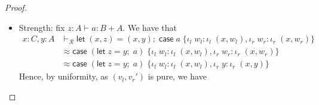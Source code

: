 \documentclass[acmsmall,screen,anonymous,review]{acmart}
\newcommand{\mc}[1]{\ensuremath{\mathcal{#1}}}
\newcommand{\ms}[1]{\ensuremath{\mathsf{#1}}}
\newcommand{\lto}{:}
\newcommand{\linl}[1]{\iota_l\;{#1}}
\newcommand{\linr}[1]{\iota_r\;{#1}}
\newcommand{\letexpr}[3]{\ensuremath{\ms{let}\;#1 = #2;\;#3}}
\newcommand{\caseexpr}[5]{\ms{case}\;#1\;\{\linl{#2} \lto #3, \linr{#4} \lto #5\}}
\newcommand{\liter}[3]{\ms{iter}\;#1\;\{ \linr{#2} \lto #3 \}}
\newcommand{\einf}[1]{#1 \in \mc{E}^\infty}
\newcommand{\hasty}[4]{#1 \vdash_{#2} #3: {#4}}
\newcommand{\cref}{\twoheadrightarrow}
\newcommand{\brle}[1]{{\textsf{#1}}}
\begin{document}
\begin{proof}
\begin{itemize}
\begin{itemize}
\begin{align*}
      = ((\lambda x.a) ; [\ms{id}, \iota_r])^\dagger
    \end{align*}
    \item Directed Uniformity: assume that
    \begin{align*}
    (\lambda x . a) ; (\lambda y . b) \cref^p (\lambda y . b') ; \ms{id} + (\lambda x . a)
    \end{align*}
    Unfolding both sides of this refinement, we hence have that
    \begin{align*}
    (\lambda x . \letexpr{y}{a}{b}) \cref^p
    (\lambda y . \caseexpr{b'}{z}{\linl{z}}{x}{\linr{a}})
    \end{align*}
    We therefore, by \brle{unif$^p$}, have that
    \begin{align*}
    (\lambda x . a) ; (\lambda y . b)^\dagger 
    &= (\lambda x. \liter{a}{y}{b}) 
     = (\lambda z. \letexpr{x}{z}{\liter{a}{y}{b}})
    \\
    &\cref^p (\lambda z. \liter{z}{y}{b'}) = (\lambda y . b')^\dagger
    \end{align*}
    as desired.
    \item Dinaturality: we have that
    \begin{proposition}
      If $(-)^\dagger$ is an iteration operator which satisfies naturality and codiagonal and is
      $\mc{K}$-uniform for $\mc{K}$ cocartesian, then it also satisfies dinaturality.
    \end{proposition}
    \begin{proof}
      See Lemma 31 of \citet{goncharov-18-guarded-traced}
    \end{proof}
    Since all $\ms{Tm}_\epsilon(\mc{R})$ for $\einf{\epsilon}$ are $\ms{Tm}_\bot(\mc{R})$-uniform,
    and $\ms{Tm}_\bot(\mc{R})$ is cocartesian, $\ms{Tm}_\epsilon(\mc{R})$ must in fact satisfy
    dinaturality as desired.
  \end{itemize}
  \item Strength: fix $\hasty{z : A}{}{a}{B + A}$. We have that
  \begin{align*}
    x : C, y : A &
      \vdash_{\mc{R}} 
      \letexpr{(x, z)}{(x, y)}{\caseexpr{a}{w_l}{\linl{(x, w_l)}}{w_r}{\linr{(x, w_r)}}} \\
      &\approx \caseexpr{(\letexpr{z}{y}{a})}{w_l}{\linl{(x, w_l)}}{w_r}{\linr{(x, w_r)}} \\
      &\approx \caseexpr{(\letexpr{z}{y}{a})}{w_l}{\linl{(x, w_l)}}{y}{\linr{(x, y)}}
  \end{align*}
  Hence, by uniformity, as $(v_l, v_r')$ is pure, we have

\end{itemize}
\end{proof}
\end{document}
